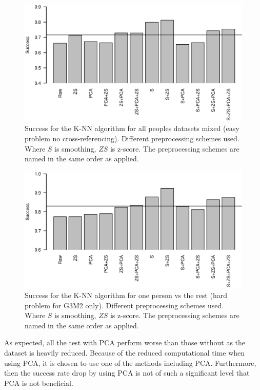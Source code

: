 \begin{figure}[H]
\includegraphics[width = 0.9 \textwidth]{graphics/knn_zscore_2}
\caption{Success for the K-NN algorithm for all peoples datasets mixed (easy problem no cross-referencing). Different preprocessing schemes used.
Where $S$ is smoothing, $ZS$ is z-score.
The preprocessing schemes are named in the same order as applied.}
\label{fig:knn_zscore_2}
\end{figure}

\begin{figure}[H]
\includegraphics[width = 0.9 \textwidth]{graphics/knn_zscore_3}
\caption{Success for the K-NN algorithm for one person vs the rest (hard problem for G3M2 only). Different preprocessing schemes used.
Where $S$ is smoothing, $ZS$ is z-score.
The preprocessing schemes are named in the same order as applied.}
\label{fig:knn_zscore_3}
\end{figure}


As expected, all the test with PCA perform worse than those without as the dataset is heavily reduced.
Because of the reduced computational time when using PCA, it is chosen to use one of the methods including PCA.
Furthermore, then the success rate drop by using PCA is not of such a significant level that PCA is not beneficial.

